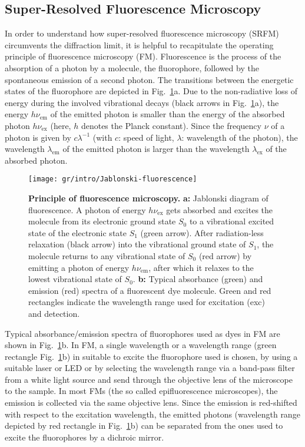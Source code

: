 
\subsection{Super-Resolved Fluorescence Microscopy}
\label{sec:srfm}
In order to understand how super-resolved fluorescence microscopy (SRFM)
circumvents the diffraction limit, it is helpful to recapitulate the operating
principle of fluorescence microscopy (FM). Fluorescence is the process of the
absorption of a photon by a molecule, the fluorophore, followed by the
spontaneous emission of a second photon. The transitions between the energetic
states of the fluorophore are depicted in
Fig.~\ref{fig:jablonski-fluorescence}a. Due to the non-radiative loss of
energy during the involved vibrational decays (black arrows in
Fig.~\ref{fig:jablonski-fluorescence}a), the energy $h\nu_\text{em}$ of the
emitted photon is smaller than the energy of the absorbed photon
$h\nu_\text{ex}$ (here, $h$ denotes the Planck constant). Since the frequency $\nu$
of a photon is given by $c\lambda^{-1}$ (with $c$: speed of light, $\lambda$:
wavelength of the photon), the wavelength $\lambda_\text{em}$ of the emitted
photon is larger than the wavelength $\lambda_\text{ex}$ of the absorbed
photon.      

\begin{figure}
  \centering
  \texttt{[image: gr/intro/Jablonski-fluorescence]}
  
  \caption{%
    \textbf{Principle of fluorescence microscopy.}
    \textbf{a:}
      Jablonski diagram of fluorescence. A photon of energy
      $h\nu_\text{ex}$ gets absorbed and excites the molecule from its
      electronic ground state $S_0$ to a vibrational excited state of the
      electronic state $S_1$ (green arrow). After radiation-less relaxation
      (black arrow) into the vibrational ground state of $S_1$, the molecule
      returns to any vibrational state of $S_0$ (red arrow) by emitting a photon
      of energy $h\nu_\text{em}$, after which it relaxes to the lowest
      vibrational state of $S_0$.
    \textbf{b:}
      Typical absorbance (green) and
      emission (red) spectra of a fluorescent dye molecule. Green and red
      rectangles indicate the wavelength range used for excitation (exc) and
      detection.
  }
  \label{fig:jablonski-fluorescence}
\end{figure}

Typical absorbance/emission spectra of fluorophores used as dyes in FM are
shown in Fig.~\ref{fig:jablonski-fluorescence}b. In FM, a single wavelength or
a wavelength range (green rectangle Fig.~\ref{fig:jablonski-fluorescence}b) in
suitable to excite the fluorophore used is chosen, by using a suitable laser
or LED or by selecting the wavelength range via a band-pass filter from a
white light source and send through the objective lens of the microscope to
the sample. In most FMs (the so called epifluorescence microscopes), the
emission is collected via the same objective lens. Since the emission is
red-shifted with respect to the excitation wavelength, the emitted photons
(wavelength range depicted by red rectangle in
Fig.~\ref{fig:jablonski-fluorescence}b) can be separated from the ones used to
excite the fluorophores by a dichroic mirror.


